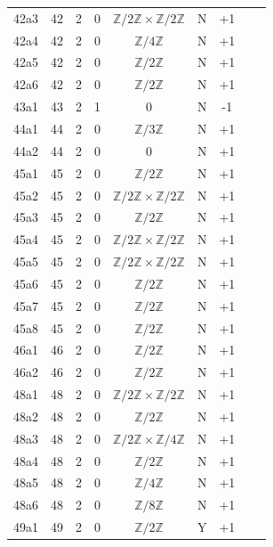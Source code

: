\begin{longtable}{ccccccccc}
42a3 & 42 & 2 & 0 & $\mathbb{Z}/2\mathbb{Z} \times \mathbb{Z}/2\mathbb{Z}$ & N & +1 &  &  \\
42a4 & 42 & 2 & 0 & $\mathbb{Z}/4\mathbb{Z}$ & N & +1 &  &  \\
42a5 & 42 & 2 & 0 & $\mathbb{Z}/2\mathbb{Z}$ & N & +1 &  &  \\
42a6 & 42 & 2 & 0 & $\mathbb{Z}/2\mathbb{Z}$ & N & +1 &  &  \\
43a1 & 43 & 2 & 1 & 0 & N & -1 &  &  \\
44a1 & 44 & 2 & 0 & $\mathbb{Z}/3\mathbb{Z}$ & N & +1 &  &  \\
44a2 & 44 & 2 & 0 & 0 & N & +1 &  &  \\
45a1 & 45 & 2 & 0 & $\mathbb{Z}/2\mathbb{Z}$ & N & +1 &  &  \\
45a2 & 45 & 2 & 0 & $\mathbb{Z}/2\mathbb{Z} \times \mathbb{Z}/2\mathbb{Z}$ & N & +1 &  &  \\
45a3 & 45 & 2 & 0 & $\mathbb{Z}/2\mathbb{Z}$ & N & +1 &  &  \\
45a4 & 45 & 2 & 0 & $\mathbb{Z}/2\mathbb{Z} \times \mathbb{Z}/2\mathbb{Z}$ & N & +1 &  &  \\
45a5 & 45 & 2 & 0 & $\mathbb{Z}/2\mathbb{Z} \times \mathbb{Z}/2\mathbb{Z}$ & N & +1 &  &  \\
45a6 & 45 & 2 & 0 & $\mathbb{Z}/2\mathbb{Z}$ & N & +1 &  &  \\
45a7 & 45 & 2 & 0 & $\mathbb{Z}/2\mathbb{Z}$ & N & +1 &  &  \\
45a8 & 45 & 2 & 0 & $\mathbb{Z}/2\mathbb{Z}$ & N & +1 &  &  \\
46a1 & 46 & 2 & 0 & $\mathbb{Z}/2\mathbb{Z}$ & N & +1 &  &  \\
46a2 & 46 & 2 & 0 & $\mathbb{Z}/2\mathbb{Z}$ & N & +1 &  &  \\
48a1 & 48 & 2 & 0 & $\mathbb{Z}/2\mathbb{Z} \times \mathbb{Z}/2\mathbb{Z}$ & N & +1 &  &  \\
48a2 & 48 & 2 & 0 & $\mathbb{Z}/2\mathbb{Z}$ & N & +1 &  &  \\
48a3 & 48 & 2 & 0 & $\mathbb{Z}/2\mathbb{Z} \times \mathbb{Z}/4\mathbb{Z}$ & N & +1 &  &  \\
48a4 & 48 & 2 & 0 & $\mathbb{Z}/2\mathbb{Z}$ & N & +1 &  &  \\
48a5 & 48 & 2 & 0 & $\mathbb{Z}/4\mathbb{Z}$ & N & +1 &  &  \\
48a6 & 48 & 2 & 0 & $\mathbb{Z}/8\mathbb{Z}$ & N & +1 &  &  \\
49a1 & 49 & 2 & 0 & $\mathbb{Z}/2\mathbb{Z}$ & Y & +1 &  &  \\

\end{longtable}
